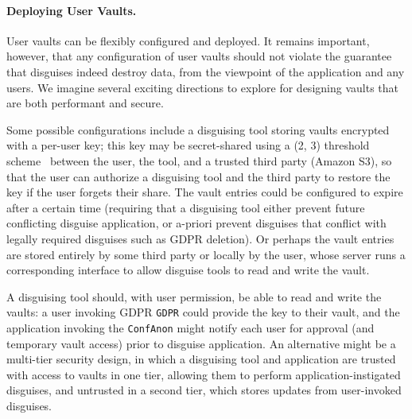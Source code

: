 \paragraph{Deploying User Vaults.}
User vaults can be flexibly configured and deployed. It remains important, however, that any
configuration of user vaults should not violate the guarantee that disguises indeed destroy data,
from the viewpoint of the application and any users.
We imagine several exciting directions to explore for designing vaults that are both
performant and secure.
%

%
Some possible configurations include a disguising tool storing vaults encrypted with a per-user key; this key
may be secret-shared using a (2, 3) threshold scheme~\cite{secretsharing} between the user, the
tool, and a trusted third party (\eg Amazon S3), so that the user can authorize a disguising tool and the
third party to restore the key if the user forgets their share.
%
The vault entries could be configured to expire after a certain time (requiring that a disguising tool either
prevent future conflicting disguise application, or a-priori prevent disguises that conflict with
legally required disguises such as GDPR deletion).
%
Or perhaps the vault entries are stored entirely by some third party or locally by the user, whose
server runs a corresponding interface to allow disguise tools to read and write the vault.

A disguising tool should, with user permission, be able to read and write the vaults: a user invoking GDPR
\texttt{GDPR} could provide the key to their vault, and the application invoking the
\texttt{ConfAnon} might notify each user for approval (and temporary vault access) prior to disguise
application. An alternative might be a multi-tier security design, in which a disguising tool and application
are trusted with access to vaults in one tier, allowing them to perform application-instigated
disguises, and untrusted in a second tier, which stores updates from user-invoked disguises.


